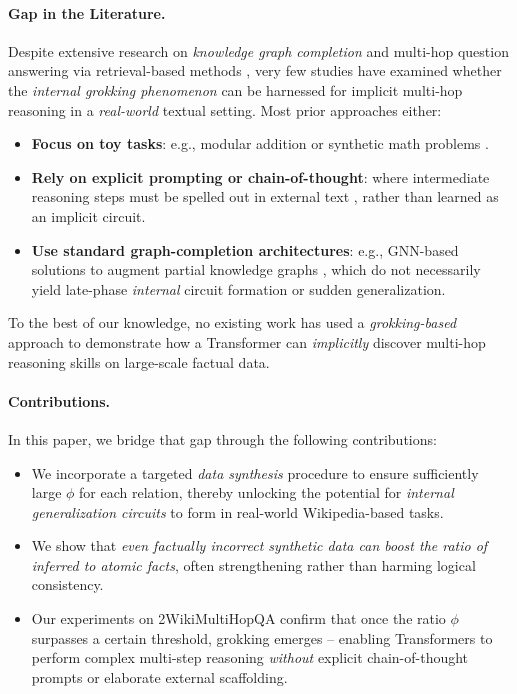     \paragraph{Gap in the Literature.}
        Despite extensive research on \emph{knowledge graph completion} \citep{liu_joint_2022} and multi-hop question answering via retrieval-based methods \citep{yang_hotpotqa_2018, ho_2WikiMultiHopQA_2020}, very few studies have examined whether the \emph{internal grokking phenomenon} can be harnessed for implicit multi-hop reasoning in a \emph{real-world} textual setting. Most prior approaches either:
        \begin{itemize}
            \item \textbf{Focus on toy tasks}: e.g., modular addition or synthetic math problems \citep{power2022grokking, nanda2023progress, wang_grokked_2024}.
            \item \textbf{Rely on explicit prompting or chain-of-thought}: where intermediate reasoning steps must be spelled out in external text \citep{plaat2024reasoning}, rather than learned as an implicit circuit.
            \item \textbf{Use standard graph-completion architectures}: e.g., GNN-based solutions to augment partial knowledge graphs \citep{liu_joint_2022}, which do not necessarily yield late-phase \emph{internal} circuit formation or sudden generalization.
        \end{itemize}
        To the best of our knowledge, no existing work has used a \emph{grokking-based} approach to demonstrate how a Transformer can \emph{implicitly} discover multi-hop reasoning skills on large-scale factual data. 
    
    \paragraph{Contributions.}
        In this paper, we bridge that gap through the following contributions:
    
        \begin{itemize}
            \item We incorporate a targeted \emph{data synthesis} procedure to ensure sufficiently large $\phi$ for each relation, thereby unlocking the potential for \emph{internal generalization circuits} to form in real-world Wikipedia-based tasks.
            \item We show that \emph{even factually incorrect synthetic data can boost the ratio of inferred to atomic facts}, often strengthening rather than harming logical consistency. 
            \item  Our experiments on 2WikiMultiHopQA confirm that once the ratio $\phi$ surpasses a certain threshold, grokking emerges -- enabling Transformers to perform complex multi-step reasoning \emph{without} explicit chain-of-thought prompts or elaborate external scaffolding.
        \end{itemize}
        
